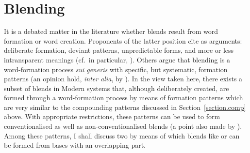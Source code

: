 \documentclass[output=paper
  ,nobabel
  ,draftmode
  ,colorlinks, citecolor=brown
]{langscibook}
\begin{document}
\section{Blending}
\label{section.blend}
It is a debated matter in the literature whether blends result from word
formation or word creation. Proponents of the latter position cite as arguments:
deliberate formation, deviant patterns, unpredictable forms, and more or less
intransparent meanings (cf.\, in particular, \citealt{ronneberger-sibold:2006:lexical:blends,ronneberger-sibold:2015:word:creation}). Others argue that blending is a
word-formation process \emph{sui generis} with specific,
but systematic, formation patterns (an opinion hold, \emph{inter
alia}, by \citealt{mueller:et:al:2011:kontamination}). In the view taken here, there
exists a subset of blends in Modern  systems that, although deliberately
created, are formed through a word-formation process by means of formation
patterns which are very similar to the compounding patterns discussed in
Section \ref{section.comp} above. With appropriate
restrictions, these patterns can be used to form conventionalised as well as
non-conventionalised blends (a point also made by \citealt{schulz:2004:jein:fortschrott}). Among these patterns, I shall discuss
two by means of which blends like \emph{} or \emph{} can be formed from bases with an overlapping
part.
\end{document}
